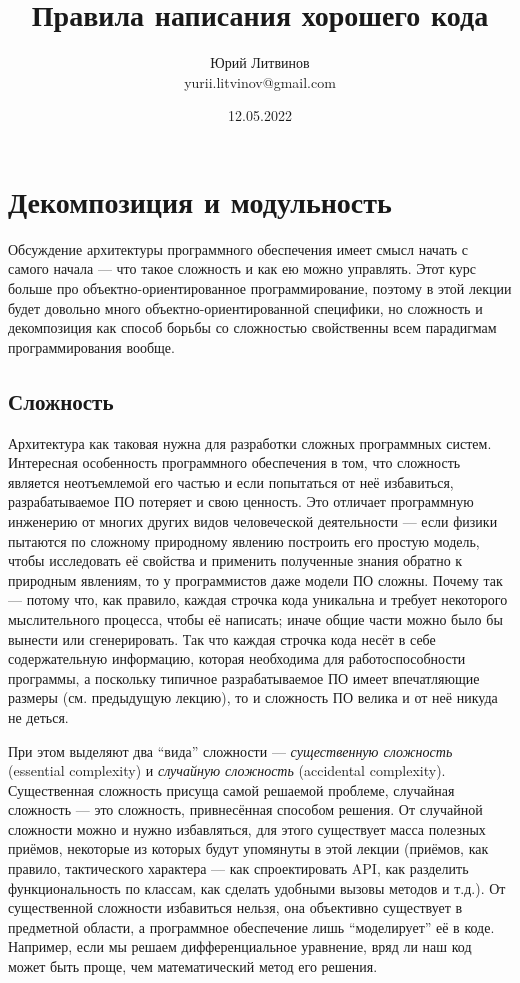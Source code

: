 \documentclass[a5paper]{article}
\title{Правила написания хорошего кода}
\author{Юрий Литвинов\\\small{yurii.litvinov@gmail.com}}
\date{12.05.2022}
\begin{document}
\maketitle
\thispagestyle{empty}

\section{Декомпозиция и модульность}


Обсуждение архитектуры программного обеспечения имеет смысл начать с самого начала --- что такое сложность и как ею можно управлять. Этот курс больше про объектно-ориентированное программирование, поэтому в этой лекции будет довольно много объектно-ориентированной специфики, но сложность и декомпозиция как способ борьбы со сложностью свойственны всем парадигмам программирования вообще.

\subsection{Сложность}

Архитектура как таковая нужна для разработки сложных программных систем. Интересная особенность программного обеспечения в том, что сложность является неотъемлемой его частью и если попытаться от неё избавиться, разрабатываемое ПО потеряет и свою ценность. Это отличает программную инженерию от многих других видов человеческой деятельности --- если физики пытаются по сложному природному явлению построить его простую модель, чтобы исследовать её свойства и применить полученные знания обратно к природным явлениям, то у программистов даже модели ПО сложны. Почему так --- потому что, как правило, каждая строчка кода уникальна и требует некоторого мыслительного процесса, чтобы её написать; иначе общие части можно было бы вынести или сгенерировать. Так что каждая строчка кода несёт в себе содержательную информацию, которая необходима для работоспособности программы, а поскольку типичное разрабатываемое ПО имеет впечатляющие размеры (см. предыдущую лекцию), то и сложность ПО велика и от неё никуда не деться.

При этом выделяют два ``вида'' сложности --- \textit{существенную сложность} (essential complexity) и \textit{случайную сложность} (accidental complexity). Существенная сложность присуща самой решаемой проблеме, случайная сложность --- это сложность, привнесённая способом решения. От случайной сложности можно и нужно избавляться, для этого существует масса полезных приёмов, некоторые из которых будут упомянуты в этой лекции (приёмов, как правило, тактического характера --- как спроектировать API, как разделить функциональность по классам, как сделать удобными вызовы методов и т.д.). От существенной сложности избавиться нельзя, она объективно существует в предметной области, а программное обеспечение лишь ``моделирует'' её в коде. Например, если мы решаем дифференциальное уравнение, вряд ли наш код может быть проще, чем математический метод его решения.
\end{document}
